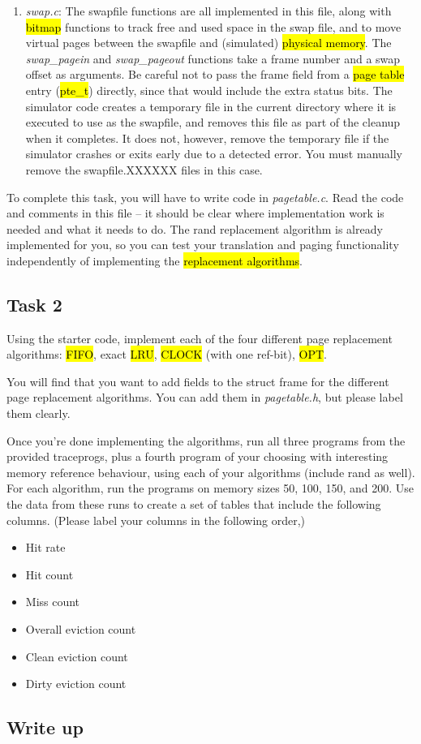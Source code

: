 \documentclass[12pt]{article}
\begin{document}
\begin{enumerate}[1.]
    \item \textit{swap.c}: The swapfile functions are all implemented in this
    file, along with \hl{bitmap} functions to track free and used space in the swap
    file, and to move virtual pages between the swapfile and (simulated)
    \hl{physical memory}. The \textit{swap\_pagein} and \textit{swap\_pageout}
    functions take a frame number and a swap offset as arguments. Be careful not
    to pass the frame field from a \hl{page table} entry (\hl{pte\_t}) directly, since that
    would include the extra status bits. The simulator code creates a temporary
    file in the current directory where it is executed to use as the swapfile,
    and removes this file as part of the cleanup when it completes. It does not,
    however, remove the temporary file if the simulator crashes or exits early
    due to a detected error. You must manually remove the swapfile.XXXXXX files
    in this case.
\end{enumerate}

\bigskip

\noindent To complete this task, you will have to write code in \textit{pagetable.c}. Read the code
and comments in this file -- it should be clear where implementation work is
needed and what it needs to do. The rand replacement algorithm is already implemented
for you, so you can test your translation and paging functionality independently
of implementing the \hl{replacement algorithms}.

\subsection{Task 2}

\bigskip

\noindent Using the starter code, implement each of the four different page replacement
algorithms: \hl{FIFO}, exact \hl{LRU}, \hl{CLOCK} (with one ref-bit), \hl{OPT}.

\bigskip

\noindent You will find that you want to add fields to the struct frame for the different
page replacement algorithms. You can add them in \textit{pagetable.h}, but please label
them clearly.

\bigskip

\noindent Once you're done implementing the algorithms, run all three programs from the
provided traceprogs, plus a fourth program of your choosing with interesting memory
reference behaviour, using each of your algorithms (include rand as well). For each
algorithm, run the programs on memory sizes 50, 100, 150, and 200. Use the data
from these runs to create a set of tables that include the following columns.
 (Please label your columns in the following order,)

\bigskip

\begin{itemize}
    \item Hit rate
    \item Hit count
    \item Miss count
    \item Overall eviction count
    \item Clean eviction count
    \item Dirty eviction count
\end{itemize}


\subsection{Write up}
\end{document}
